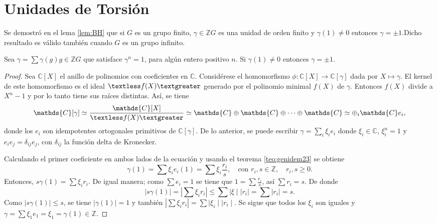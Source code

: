 \section{\quad Unidades de Torsión}
Se demostró en el lema \ref{lem:BH} que si $G$ es un grupo finito, $\gamma \in \mathds{Z}G$ es una unidad de orden finito y $\gamma(1) \neq 0$ entonces $\gamma = \pm 1$.Dicho resultado es válido también cuando $G$ es un grupo infinito. 
\begin{teorema}\label{teo:Passman-Bass}
Sea $\gamma = \sum\gamma(g)g \in \mathds{Z}G$ que satisface $\gamma^n = 1$, para algún entero positivo $n$. Si $\gamma(1) \neq 0$ entonces $\gamma = \pm 1$.
\end{teorema} 
\begin{proof}
Sea $\mathds{C}[X]$ el anillo de polinomios con coeficientes en $\mathds{C}$. Considérese el homomorfismo $\phi \colon \mathds{C}[X] \to \mathds{C}[\gamma]$ dada por $X \mapsto \gamma$. El kernel de este homomorfismo es el ideal $\textless f(X) \textgreater$ generado por el polinomio minimal $f(X)$ de $\gamma$. Entonces $f(X)$ divide a $X^n - 1$ y por lo tanto tiene sus raíces distintas. 
Así, se tiene 
\begin{equation*}
\mathds{C}[\gamma] \simeq \frac{\mathds{C}[X]}{\textless f(X) \textgreater} \simeq \mathds{C}\oplus\mathds{C}\oplus\cdots\oplus\mathds{C} \simeq \oplus_i\mathds{C}e_i,
\end{equation*}
donde los $e_i$ son idempotentes ortogonales primitivos de $\mathds{C}[\gamma]$. De lo anterior, se puede escribir $\gamma = \sum_{i}\xi_ie_i$ donde $\xi_i\in \mathds{C}$, $\xi_i^n = 1$ y $e_ie_j = \delta_{ij}e_j$, con $\delta_{ij}$ la función delta de Kronecker. 

Calculando el primer coeficiente en ambos lados de la ecuación y usando el teorema \ref{teo:genidem23} se obtiene
\begin{equation*}
\gamma(1) = \sum\xi_ie_i(1) = \sum\xi_i\frac{r_i}{s}, \quad \mbox{con } r_i, s \in \mathds{Z}, \quad r_i,s \geq 0.
\end{equation*}
Entonces, $s\gamma(1) = \sum\xi_ir_i$. De igual manera; como $\sum e_i = 1$ se tiene que $1 = \sum \frac{r_i}{s}$, así $\sum r_i = s$. De donde
\begin{equation*}
\mid s\gamma(1) \mid = \left| \sum\xi_ir_i  \right| \leq \sum \mid \xi \mid \mid r_i \mid = \sum \mid r_i \mid = s.
\end{equation*}
Como $\mid s\gamma(1) \mid \leq s$, se tiene $\mid \gamma(1) \mid = 1$ y también $\left| \sum \xi_ir_i \right| = \sum \mid \xi_i \mid \mid r_i \mid$. Se sigue que todos los $\xi_i$ son iguales y $\gamma = \sum \xi_1e_1 = \xi_1 = \gamma(1) \in \mathds{Z}$. 
\end{proof}

